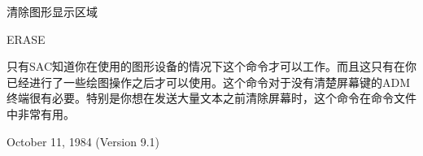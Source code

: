 \label{cmd:erase}

清除图形显示区域

ERASE

只有SAC知道你在使用的图形设备的情况下这个命令才可以工作。而且这只有在你已经进行了一些绘图操作之后才可以使用。这个命令对于没有清楚屏幕键的ADM终端很有必要。特别是你想在发送大量文本之前清除屏幕时，这个命令在命令文件中非常有用。

October 11, 1984 (Version 9.1)

